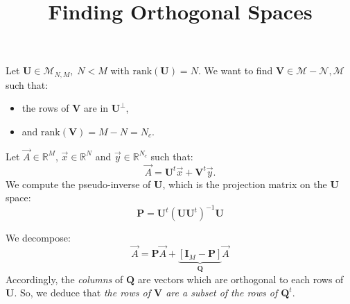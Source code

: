 \documentclass[aps,onecolumn,11pt]{revtex4}
\newcommand{\rank}{\mathrm{rank}}
\begin{document}
\title{\Large Finding Orthogonal Spaces}
\maketitle

Let $\bm{U}\in\mathcal{M}_{N,M}, \; N<M$ with $\rank(\bm{U})=N$.
We want to find $\bm{V}\in\mathcal{M-N,M}$ such that:
\begin{itemize}
\item the rows of
$\bm{V}$ are in $\bm{U}^\perp$,
\item and $\rank(\bm{V})=M-N=N_c$.
\end{itemize}

Let $\vec{A}\in\mathbb{R}^M$, $\vec{x}\in\mathbb{R}^N$ and $\vec{y}\in\mathbb{R}^{N_c}$ such that:
\begin{equation}
	\vec{A} = \bm{U}^t \vec{x} + \bm{V}^t \vec{y}.
\end{equation}
We compute the pseudo-inverse of $\bm{U}$, which is the projection matrix on the $\bm{U}$ space:
\begin{equation}
	\bm{P} = \bm{U}^t \left(\bm{U}\bm{U}^t\right)^{-1} \bm{U}
\end{equation}

We decompose:
\begin{equation}
	\vec{A} = \bm{P} \vec{A} + \underbrace{\left[\bm{I}_M - \bm{P} \right]}_{\bm{Q}} \vec{A}
\end{equation}
Accordingly, the \textit{columns} of $\bm{Q}$ are vectors which are orthogonal to each rows of $\bm{U}$.
So, we deduce that \textit{the rows of $\bm{V}$ are a subset of the rows of $\bm{Q}^t$}.
\end{document}
